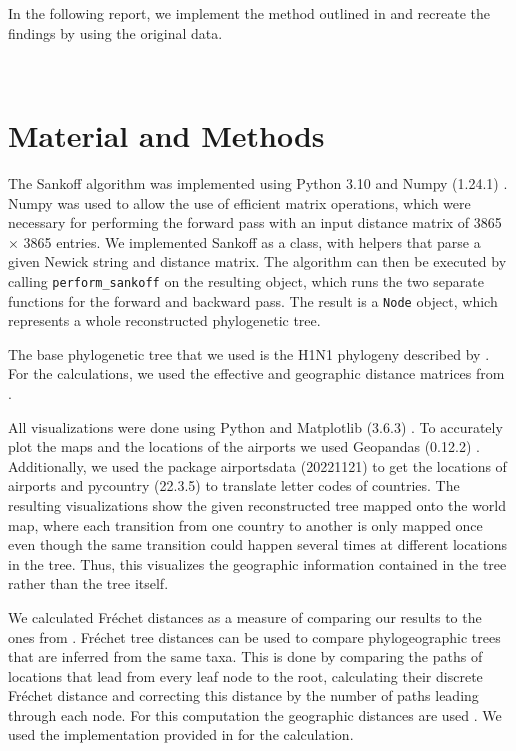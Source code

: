 \documentclass{article}
\begin{document}
In the following report, we implement the method outlined in
\cite{reimeringPhylogeographicReconstructionUsing2020} and recreate the findings
by using the original data.

\ \\
\section{Material and Methods}
The Sankoff algorithm was implemented using Python 3.10
\cite{pythonsoftwarefoundationWelcomePythonOrg2023} and Numpy (1.24.1)
\cite{harrisArrayProgrammingNumPy2020}. Numpy was used to allow the use of
efficient matrix operations, which were necessary for performing the forward
pass with an input distance matrix of 3865 $\times$ 3865 entries. We implemented
Sankoff as a class, with helpers that parse a given Newick string and distance matrix. The
algorithm can then be executed by calling \texttt{perform\_sankoff} on the
resulting object, which runs the two separate functions for the forward and
backward pass. The result is a \texttt{Node} object, which represents a whole
reconstructed phylogenetic tree.

The base phylogenetic tree that we used is the H1N1 phylogeny described by
\cite{reimeringPhylogeographicReconstructionUsing2020}. For the calculations, we
used the effective and geographic distance matrices from
\cite{reimeringDistanceMatricesParsimonious2019}. 

All visualizations were done using Python and Matplotlib (3.6.3)
\cite{MatplotlibVisualizationPython}. To accurately plot the maps and the
locations of the airports we used Geopandas (0.12.2)
\cite{GeoPandas12GeoPandas}. Additionally, we used the package airportsdata
(20221121) \cite{borsettiAirportsdataExtensiveDatabase2022} to get the locations
of airports and pycountry (22.3.5) \cite{theunePycountryISOCountry} to translate
letter codes of countries. The resulting visualizations show the given
reconstructed tree mapped onto the world map, where each transition from one
country to another is only mapped once even though the same transition could
happen several times at different locations in the tree. Thus, this visualizes
the geographic information contained in the tree rather than the tree itself.

We calculated Fr\'{e}chet distances as a measure of comparing our results to the
ones from \cite{reimeringPhylogeographicReconstructionUsing2020}. Fr\'{e}chet
tree distances can be used to compare phylogeographic trees that are inferred
from the same taxa. This is done by comparing the paths of locations that lead
from every leaf node to the root, calculating their discrete Fr\'{e}chet
distance and correcting this distance by the number of paths leading through
each node. For this computation the geographic distances are used
\cite{reimeringFrechetTreeDistance2018}. We used the implementation provided in
\cite{reimeringFrechetTreeDistance2018} for the calculation.
\end{document}
